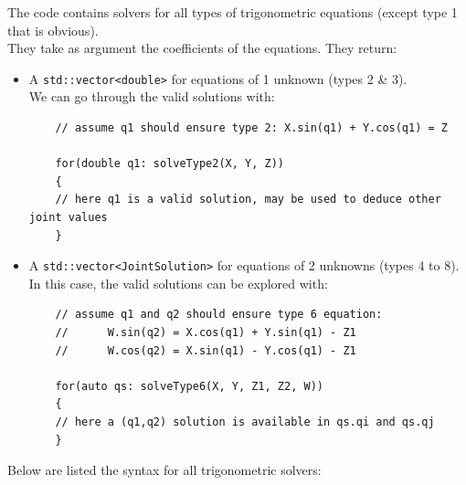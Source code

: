 \documentclass{ecnreport}
\begin{document}
  The code contains solvers for all types of trigonometric equations (except type 1 that is obvious).\\
  They take as argument the coefficients of the equations. They return:
  \begin{itemize}
    \item A \texttt{std::vector<double>} for equations of 1 unknown (types 2 \& 3).\\We can go through the valid solutions with:
    \cppstyle
    \begin{lstlisting}
    // assume q1 should ensure type 2: X.sin(q1) + Y.cos(q1) = Z
    
    for(double q1: solveType2(X, Y, Z))
    {
    // here q1 is a valid solution, may be used to deduce other joint values
    }
    \end{lstlisting}
    \item A \texttt{std::vector<JointSolution>} for equations of 2 unknowns (types 4 to 8).\\In this case, the valid solutions can be explored with:
    \cppstyle
    \begin{lstlisting}
    // assume q1 and q2 should ensure type 6 equation: 
    //		W.sin(q2) = X.cos(q1) + Y.sin(q1) - Z1
    //		W.cos(q2) = X.sin(q1) - Y.cos(q1) - Z1
    
    for(auto qs: solveType6(X, Y, Z1, Z2, W))
    {
    // here a (q1,q2) solution is available in qs.qi and qs.qj
    }
    \end{lstlisting}
  \end{itemize}
  
  \newpage
  Below are listed the syntax for all trigonometric solvers:\\
  
\end{document}
